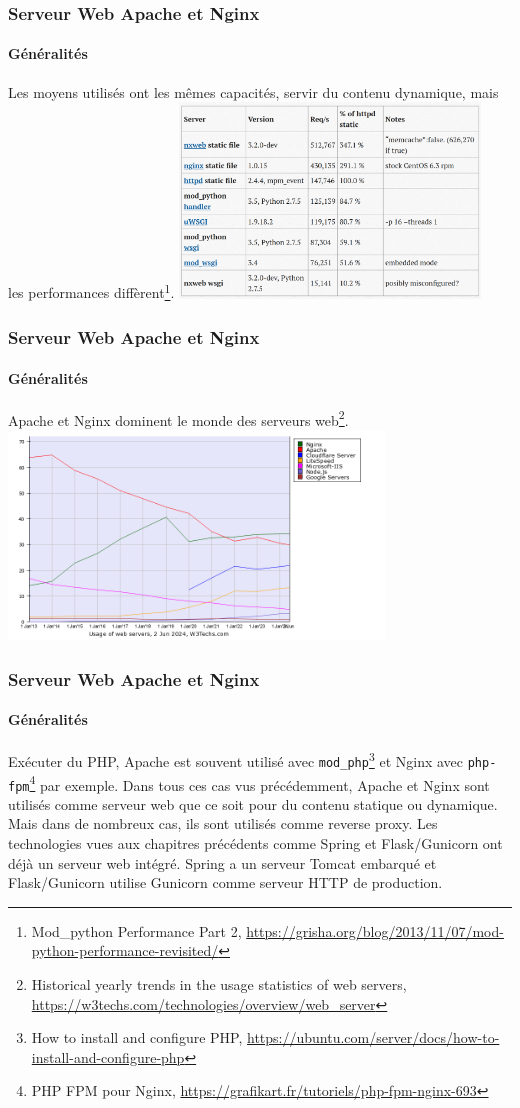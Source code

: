 \documentclass{beamer}
\begin{document}
    \begin{frame}
        \transdissolve
        \frametitle{Serveur Web Apache et Nginx}
        \framesubtitle{Généralités}
        Les moyens utilisés ont les mêmes capacités, servir du contenu dynamique, mais les performances diffèrent\footnote{Mod\_python Performance Part 2, \url{https://grisha.org/blog/2013/11/07/mod-python-performance-revisited/}}.
        \bigbreak
        \centering
        \includegraphics[width=8cm]{image/apache-nginx-benchmark}
    \end{frame}

    \begin{frame}
        \transdissolve
        \frametitle{Serveur Web Apache et Nginx}
        \framesubtitle{Généralités}
        Apache et Nginx dominent le monde des serveurs web\footnote{Historical yearly trends in the usage statistics of web servers, \url{https://w3techs.com/technologies/overview/web_server}}.
        \bigbreak
        \centering
        \includegraphics[width=10cm]{image/web-server-stats}
    \end{frame}

    \begin{frame}
        \transdissolve
        \frametitle{Serveur Web Apache et Nginx}
        \framesubtitle{Généralités}
        Exécuter du PHP, Apache est souvent utilisé avec \lstinline{mod_php}\footnote{How to install and configure PHP, \url{https://ubuntu.com/server/docs/how-to-install-and-configure-php}} et Nginx avec \lstinline{php-fpm}\footnote{PHP FPM pour Nginx, \url{https://grafikart.fr/tutoriels/php-fpm-nginx-693}} par exemple.
        \bigbreak
        Dans tous ces cas vus précédemment, Apache et Nginx sont utilisés comme serveur web que ce soit pour du contenu statique ou dynamique.
        \bigbreak
        Mais dans de nombreux cas, ils sont utilisés comme reverse proxy.
        Les technologies vues aux chapitres précédents comme Spring et Flask/Gunicorn ont déjà un serveur web intégré.
        Spring a un serveur Tomcat embarqué et Flask/Gunicorn utilise Gunicorn comme serveur HTTP de production.
    \end{frame}
\end{document}
